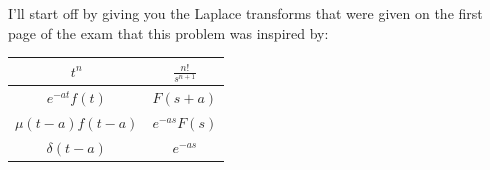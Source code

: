 \documentclass[a4paper,12pt]{article}
\begin{document}
I'll start off by giving you the Laplace transforms that were given on the first page of the exam that this problem was inspired by:

\begin{table}[ht!]
\begin{center}
\renewcommand{\arraystretch}{1.3}
\begin{tabular}{| c | c |}
\hline
$t^n$ & $\displaystyle\frac{n!}{s^{n+1}}$ \\
\hline
$e^{-at}f(t)$ & $F(s+a)$ \\
\hline
$\mu(t-a)f(t-a)$ & $e^{-as}F(s)$ \\
\hline
$\delta(t-a)$ & $e^{-as}$ \\
\hline
\end{tabular}
\end{center}
\label{table}
\end{table}
\end{document}

